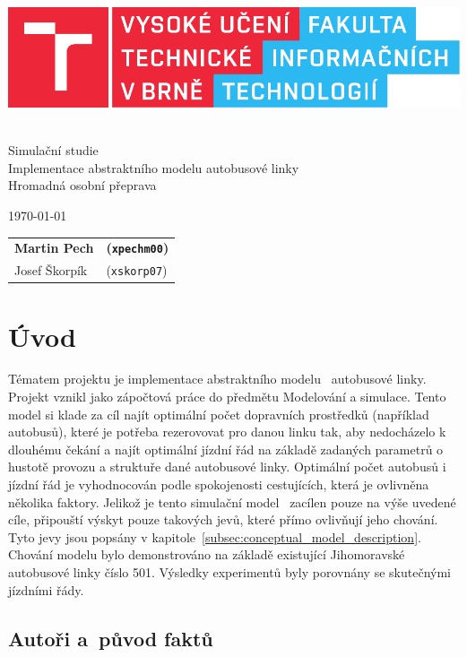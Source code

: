\documentclass[a4paper]{article}
\newcommand{\logo} {
    \includegraphics[scale=0.8, keepaspectratio]{fig/logo.pdf}
}
\begin{document}
    \begin{titlepage}
        \begin{center}
            \logo
            \\
            {\Huge Simulační studie}\\\medskip
            {\LARGE Implementace abstraktního modelu autobusové linky}\\\medskip
            {\large	Hromadná osobní přeprava}
        \end{center}
        {\Large \today \hfill
        \begin{tabular}{l l}
            \textbf{Martin Pech} & \textbf{(\texttt{xpechm00})} \\
            Josef Škorpík & (\texttt{xskorp07})
        \end{tabular}}
    \end{titlepage}

    \newpage

	\section{Úvod}
    \label{sec:intro}

    Tématem projektu je implementace abstraktního modelu~\cite[snímek 10]{IMS_slides} autobusové linky. Projekt vznikl jako zápočtová práce do předmětu Modelování a simulace.
    Tento model si klade za cíl najít optimální počet dopravních prostředků (například autobusů), které je potřeba rezerovovat pro danou linku tak, aby nedocházelo k dlouhému čekání a najít optimální jízdní řád na základě zadaných parametrů o hustotě provozu a struktuře dané autobusové linky. Optimální počet autobusů i jízdní řád je vyhodnocován podle spokojenosti cestujících, která je ovlivněna několika faktory. Jelikož je tento simulační model~\cite[snímek 44]{IMS_slides} zacílen pouze na výše uvedené cíle, připouští výskyt pouze takových jevů, které přímo ovlivňují jeho chování. Tyto jevy jsou popsány v kapitole~\ref{subsec:conceptual_model_description}.
    Chování modelu bylo demonstrováno na základě existující Jihomoravské autobusové linky číslo 501. Výsledky experimentů byly porovnány se skutečnými jízdními řády.

        \subsection{Autoři a~původ faktů}
        \label{subsec:authors}
\end{document}
